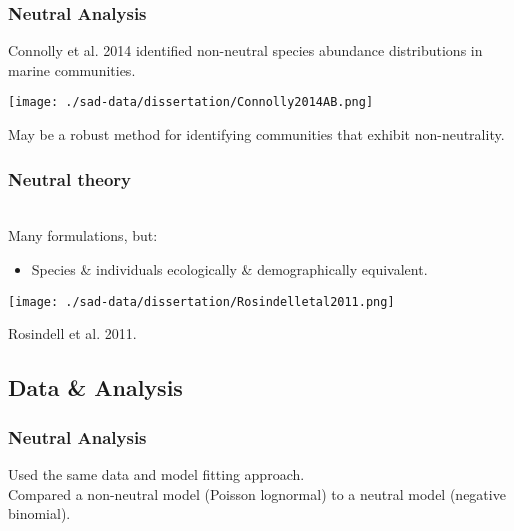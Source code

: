 \documentclass[14pt]{beamer}
\begin{document}
\begin{frame}
\frametitle{Neutral Analysis}
Connolly et al. 2014 identified non-neutral species abundance distributions in marine communities.\\
\begin{center}
\texttt{[image: ./sad-data/dissertation/Connolly2014AB.png]}
\end{center}
May be a robust method for identifying communities that exhibit non-neutrality.\\
\end{frame}

\begin{frame}[t]
\frametitle{Neutral theory}
~\\
Many formulations, but:
~\\
\begin{itemize}
\item Species \& individuals ecologically \& demographically equivalent.\\
\end{itemize}
\texttt{[image: ./sad-data/dissertation/Rosindelletal2011.png]}\\
\begin{tiny}
Rosindell et al. 2011.
\end{tiny}
\end{frame}



\subsection{Data & Analysis}
\begin{frame}
\frametitle{Neutral Analysis}
Used the same data and model fitting approach.\\
Compared a non-neutral model (Poisson lognormal) to a neutral model (negative binomial).\\
\end{frame}
\end{document}
